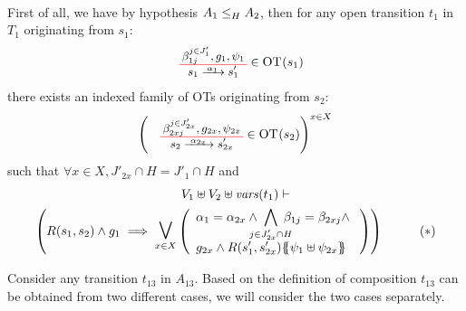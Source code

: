 \documentclass[runningheads]{llncs}
\begin{document}
\begin{enumerate}
\begin{align*}
\end{align*}
First of all, we have by hypothesis $\wrel{A_1}{A_2}{H}$, then for any open transition $t_1$ in $T_1$  originating from $s_1$:
\begin{align*}
\OTx{1}{}{1}{1} \in \fOT{s_1}
\end{align*}
there exists an indexed family of OTs originating from $s_{2}$: 
\begin{align*}
\mpar{\OTx{2}{x}{2x}{2x} \in \fOT{s_{2}}}^{x \in X} 
\end{align*}
such that $\forall x \in X, J'_{2x} \cap H = J'_1 \cap H$ and
\begin{multline*}
V_1 \uplus V_2 \uplus \fvars{t_1} \vdash\\ \mpar{R\mpar{s_1, s_{2}} \wedge g_1 \implies \operatorname*{\bigsymb{\bigvee}}_{x \in X} \mpar{\everymath{\displaystyle}
\begin{array}{l}
			\alpha_1 = \alpha_{2x} \wedge \bigwedge_\subbox{j \in J'_{2x} \cap H} \beta_{1j} = \beta_{2xj} \nwedge\\
			 g_{2x} \wedge R\mpar{s'_1, s'_{2x}}\psubst{\psi_1 \uplus \psi_{2x}}
		\end{array}}}  \qquad \quad (*)
\end{multline*}	
\smallskip

Consider any transition $t_{13}$ in $A_{13}$.  Based on  the definition of composition $t_{13}$ can be obtained from two different cases, we will consider the two cases separately. 

\end{enumerate}
\end{document}
